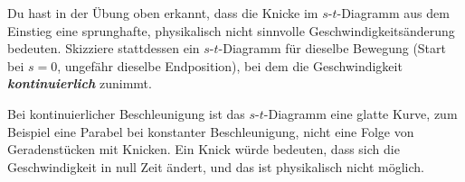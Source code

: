 \documentclass[addpoints,11pt,a4paper]{exam}
\begin{document}
\begin{questions}
\setcounter{question}{1}
\begin{taskbox}
\question[3] Du hast in der Übung oben erkannt, dass die Knicke im
$s$-$t$-Diagramm aus dem Einstieg eine sprunghafte, physikalisch nicht
sinnvolle Geschwindigkeitsänderung bedeuten. Skizziere stattdessen ein
$s$-$t$-Diagramm für dieselbe Bewegung (Start bei $s=0$, ungefähr
dieselbe Endposition), bei dem die Geschwindigkeit
\textbf{\emph{kontinuierlich}} zunimmt.

\begin{center}
\end{center}

\begin{solution}
\begin{center}
\end{center}
Bei kontinuierlicher Beschleunigung ist das $s$-$t$-Diagramm eine glatte
Kurve, zum Beispiel eine Parabel bei konstanter Beschleunigung, nicht
eine Folge von Geradenstücken mit Knicken. Ein Knick würde bedeuten,
dass sich die Geschwindigkeit in null Zeit ändert, und das ist
physikalisch nicht möglich.
\end{solution}
\end{taskbox}
\end{questions}
\end{document}
